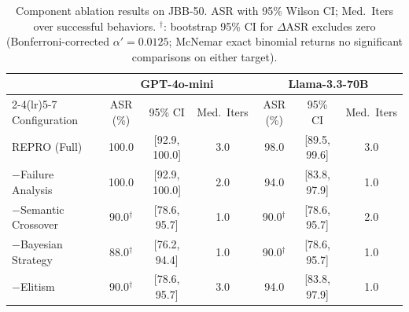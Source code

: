 \begin{table}[t]
\centering
\caption{Component ablation results on JBB-50. ASR with 95\% Wilson CI; Med.\ Iters over successful behaviors. $^\dagger$: bootstrap 95\% CI for $\Delta\text{ASR}$ excludes zero (Bonferroni-corrected $\alpha'{=}0.0125$; McNemar exact binomial returns no significant comparisons on either target).}
\begin{tabular}{lcccccc}
\toprule
& \multicolumn{3}{c}{GPT-4o-mini} & \multicolumn{3}{c}{Llama-3.3-70B} \\
\cmidrule(lr){2-4}\cmidrule(lr){5-7}
Configuration & ASR (\%) & 95\% CI & Med.\ Iters & ASR (\%) & 95\% CI & Med.\ Iters \\
\midrule
  REPRO (Full) & 100.0 & [92.9, 100.0] & 3.0 & 98.0 & [89.5, 99.6] & 3.0 \\
  $-$Failure Analysis & 100.0 & [92.9, 100.0] & 2.0 & 94.0 & [83.8, 97.9] & 1.0 \\
  $-$Semantic Crossover & 90.0$^\dagger$ & [78.6, 95.7] & 1.0 & 90.0$^\dagger$ & [78.6, 95.7] & 2.0 \\
  $-$Bayesian Strategy & 88.0$^\dagger$ & [76.2, 94.4] & 1.0 & 90.0$^\dagger$ & [78.6, 95.7] & 1.0 \\
  $-$Elitism & 90.0$^\dagger$ & [78.6, 95.7] & 3.0 & 94.0 & [83.8, 97.9] & 1.0 \\
\bottomrule
\end{tabular}
\label{tab:ablation}
\end{table}
